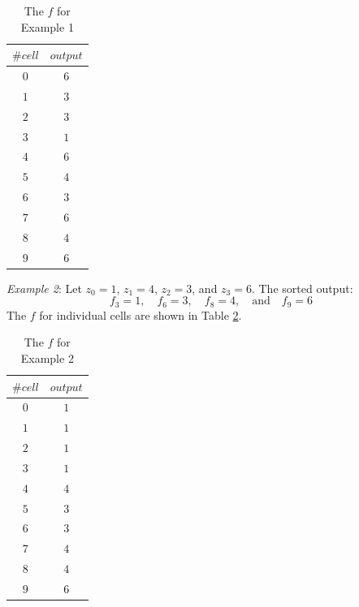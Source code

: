 \documentclass[conference]{IEEEtran}
\begin{document}
\begin{table}[h]
\caption{\centering The $f$ for Example 1\label{table:example-1}}
\centering
\begin{tabular}{|c|c|}
\hline
\textbf{$\#cell$} & \textbf{$output$} \\
\hline $0$ & $6$ \\
\hline $1$ & $3$ \\
\hline $2$ & $3$ \\
\hline $3$ & $1$ \\
\hline $4$ & $6$ \\
\hline $5$ & $4$ \\
\hline $6$ & $3$ \\
\hline $7$ & $6$ \\
\hline $8$ & $4$ \\
\hline $9$ & $6$ \\
\hline
\end{tabular}
\end{table}

\textit{Example 2}: Let \( z_0 = 1 \), \( z_1 = 4 \), \( z_2 = 3 \), and \( z_3 = 6 \). The sorted output:
\[
f_3 = 1, \quad f_6 = 3, \quad f_8 = 4, \quad \text{and} \quad f_9 = 6
\]
The $f$ for individual cells are shown in Table \ref{table:example-2}.

\begin{table}[h]
\caption{\centering The $f$ for Example 2\label{table:example-2}}
\centering
\begin{tabular}{|c|c|}
\hline
\textbf{$\#cell$} & \textbf{$output$} \\
\hline $0$ & $1$ \\
\hline $1$ & $1$ \\
\hline $2$ & $1$ \\
\hline $3$ & $1$ \\
\hline $4$ & $4$ \\
\hline $5$ & $3$ \\
\hline $6$ & $3$ \\
\hline $7$ & $4$ \\
\hline $8$ & $4$ \\
\hline $9$ & $6$ \\
\hline
\end{tabular}
\end{table}

\end{document}
